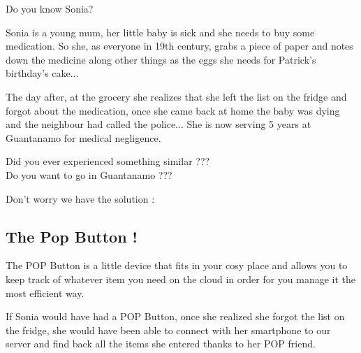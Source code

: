 \documentclass[12pt,a4paper,landscape]{article}
\begin{document}
	\begin{adjustwidth}{15em}{15em}
		\centering
	Do you know Sonia?
	
	\vspace{1em}

	Sonia is a young mum, her little baby is sick and she needs to buy some medication.
	So she, as everyone in 19th century, grabs a piece of paper and notes down the medicine along other things as the eggs she needs for Patrick's birthday's cake...
	
	The day after, at the grocery she realizes that she left the list on the fridge and forgot about the medication, once she came back at home the baby was dying and the neighbour had called the police... She is now serving 5 years at Guantanamo for medical negligence.

	\vspace{2em}

	Did you ever experienced something similar ???\\

	Do you want to go in Guantanamo ???\\

	\vspace{3em}
	
	Don't worry we have the solution :
	
	\subsection*{\centering The Pop Button !}
	
	The POP Button is a little device that fits in your cosy place and allows you to keep track of whatever item you need on the cloud in order for you manage it the most efficient way.
	
	If Sonia would have had a POP Button, once she realized she forgot the list on the fridge, she would have been able to connect with her smartphone to our server and find back all the items she entered thanks to her POP friend.
	\end{adjustwidth}

\newpage
{}
\end{document}
